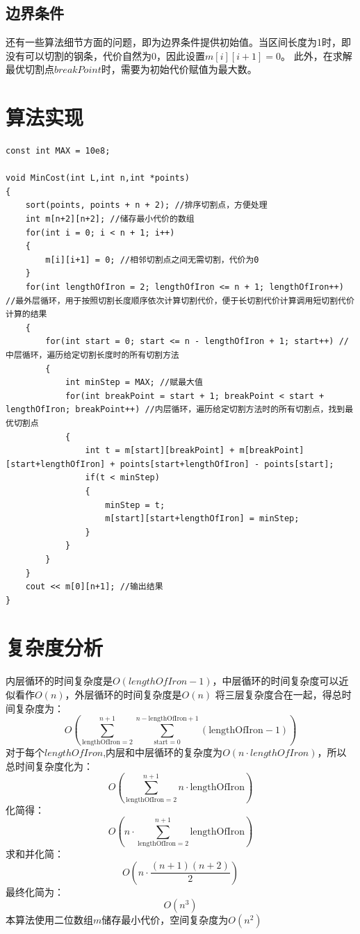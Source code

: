 \documentclass[UTF8]{ctexart}
\begin{document}
\subsection{边界条件}
还有一些算法细节方面的问题，即为边界条件提供初始值。当区间长度为1时，即没有可以切割的钢条，代价自然为0，因此设置$m[i][i+1]=0$。
此外，在求解最优切割点$breakPoint$时，需要为初始代价赋值为最大数。

\newpage

\section{算法实现}
\begin{lstlisting}
const int MAX = 10e8;

void MinCost(int L,int n,int *points)
{
    sort(points, points + n + 2); //排序切割点，方便处理
    int m[n+2][n+2]; //储存最小代价的数组
    for(int i = 0; i < n + 1; i++)
    {
        m[i][i+1] = 0; //相邻切割点之间无需切割，代价为0
    }
    for(int lengthOfIron = 2; lengthOfIron <= n + 1; lengthOfIron++) //最外层循环，用于按照切割长度顺序依次计算切割代价，便于长切割代价计算调用短切割代价计算的结果
    {
        for(int start = 0; start <= n - lengthOfIron + 1; start++) //中层循环，遍历给定切割长度时的所有切割方法
        {
            int minStep = MAX; //赋最大值
            for(int breakPoint = start + 1; breakPoint < start + lengthOfIron; breakPoint++) //内层循环，遍历给定切割方法时的所有切割点，找到最优切割点
            {
                int t = m[start][breakPoint] + m[breakPoint][start+lengthOfIron] + points[start+lengthOfIron] - points[start];
                if(t < minStep)
                {
                    minStep = t;
                    m[start][start+lengthOfIron] = minStep;
                }
            }
        }
    }
    cout << m[0][n+1]; //输出结果
}
\end{lstlisting}

\newpage

\section{复杂度分析}
内层循环的时间复杂度是$O(lengthOfIron−1)$，中层循环的时间复杂度可以近似看作$O(n)$，外层循环的时间复杂度是$O(n)$
将三层复杂度合在一起，得总时间复杂度为：
\[
O\left(\sum_{\text{lengthOfIron}=2}^{n+1} \sum_{\text{start}=0}^{n-\text{lengthOfIron}+1} (\text{lengthOfIron} - 1)\right)
\]
对于每个$lengthOfIron$,内层和中层循环的复杂度为$O(n⋅lengthOfIron)$，所以总时间复杂度化为：
\[
O\left(\sum_{\text{lengthOfIron}=2}^{n+1} n \cdot \text{lengthOfIron}\right)
\]
化简得：
\[
O\left(n \cdot \sum_{\text{lengthOfIron}=2}^{n+1} \text{lengthOfIron}\right)
\]
求和并化简：
\[
O\left(n \cdot \frac{(n+1)(n+2)}{2}\right)
\]
最终化简为：
\[
O(n^3)
\]
本算法使用二位数组$m$储存最小代价，空间复杂度为$O(n^2)$
\end{document}

